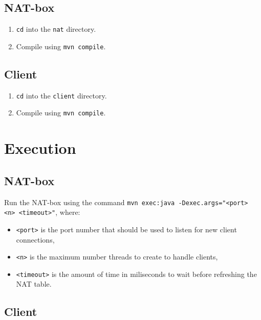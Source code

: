 \documentclass[10pt, a4paper]{article}
\begin{document}
\subsection{NAT-box}
\label{ssec:compnat}

\begin{enumerate}
  \item \texttt{cd} into the \texttt{nat} directory.
  \item Compile using \texttt{mvn compile}.
\end{enumerate}


\subsection{Client}
\label{ssec:compcli}

\begin{enumerate}
  \item \texttt{cd} into the \texttt{client} directory.
  \item Compile using \texttt{mvn compile}.
\end{enumerate}



\section{Execution}
\label{sec:exec}


\subsection{NAT-box}
\label{ssec:execnat}

Run the NAT-box using the command \texttt{mvn exec:java -Dexec.args="<port> <n>
<timeout>"}, where:
\begin{itemize}
  \item \texttt{<port>} is the port number that should be used to listen for new
    client connections,
  \item \texttt{<n>} is the maximum number threads to create to handle clients,
  \item \texttt{<timeout>} is the amount of time in miliseconds to wait before
    refreshing the NAT table.
\end{itemize}


\subsection{Client}
\label{ssec:execcli}
\end{document}
